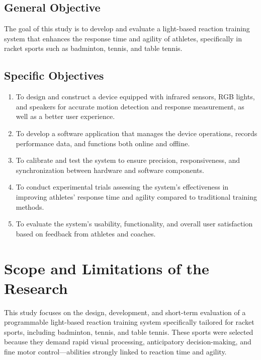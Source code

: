 \subsection{General Objective}
\label{sec:generalobjective}

The goal of this study is to develop and evaluate a light-based reaction training system that enhances the response time and agility of athletes, specifically in racket sports such as badminton, tennis, and table tennis.

\subsection{Specific Objectives}
\label{sec:specificobjectives}

\begin{enumerate}
   \item To design and construct a device equipped with infrared sensors, RGB lights, and speakers for accurate motion detection and response measurement, as well as a better user experience.
   
   \item To develop a software application that manages the device operations, records performance data, and functions both online and offline.
   
   \item To calibrate and test the system to ensure precision, responsiveness, and synchronization between hardware and software components.
   
   \item To conduct experimental trials assessing the system’s effectiveness in improving athletes’ response time and agility compared to traditional training methods.
   
   \item To evaluate the system’s usability, functionality, and overall user satisfaction based on feedback from athletes and coaches.
\end{enumerate}


\section{Scope and Limitations of the Research}
\label{sec:scopelimitations}

This study focuses on the design, development, and short-term evaluation of a programmable light-based reaction training system specifically tailored for racket sports, including badminton, tennis, and table tennis. These sports were selected because they demand rapid visual processing, anticipatory decision-making, and fine motor control—abilities strongly linked to reaction time and agility.

